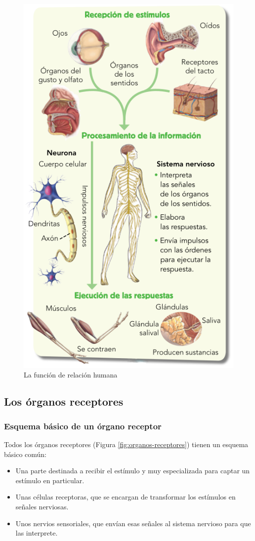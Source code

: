 \begin{figure}[!ht]
    \centering
    \includegraphics[width=0.4\linewidth]{Tema3/11_Relacion.png}
    \caption{La función de relación humana}
    \label{fig:relacion}
\end{figure}

\subsection{Los órganos receptores}

\subsubsection{Esquema básico de un órgano receptor}

Todos los órganos receptores (Figura \ref{fig:organos-receptores}) tienen un esquema básico común:

\begin{itemize}
    \item Una parte destinada a recibir el estímulo y muy especializada para captar un estímulo en particular.
    \item Unas células receptoras, que se encargan de transformar los estímulos en señales nerviosas.
    \item Unos nervios sensoriales, que envían esas señales al sistema nervioso para que las interprete.
\end{itemize}

